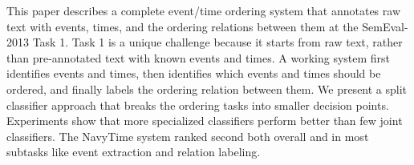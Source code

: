 This paper describes a complete event/time ordering system that annotates raw text with events, times, and the ordering relations between them at the
 SemEval-2013 Task 1. Task 1 is a unique challenge because it starts from raw
 text, rather than pre-annotated text with known events and times. A working
 system first identifies events and times, then identifies which events and
 times should be ordered, and finally labels the ordering relation between them.
 We present a split classifier approach that breaks the ordering tasks into
 smaller decision points. Experiments show that more specialized classifiers
 perform better than few joint classifiers. The NavyTime system ranked second
 both overall and in most subtasks like event extraction and relation labeling.

